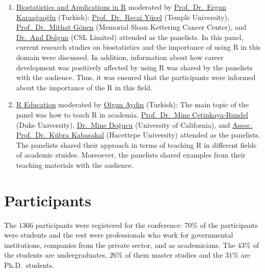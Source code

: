 \begin{enumerate}
\def\labelenumi{\arabic{enumi}.}
\item
  \href{https://www.youtube.com/watch?v=ZDMXOOVqwI8}{Biostatistics and Applications in R} moderated by \href{https://www.linkedin.com/in/ergun-karaagaoglu-8960404b/}{Prof.~Dr.~Ergun Karaağaoğlu} (Turkish):
  \href{https://cph.temple.edu/about/faculty-staff/recai-yucel-tuo13025}{Prof.~Dr.~Recai Yücel} (Temple University), \href{https://www.mskcc.org/profile/mithat-gonen}{Prof.~Dr.~Mithat Gönen} (Memorial Sloan Kettering Cancer Center), and \href{https://www.linkedin.com/in/anildolgun}{Dr.~Anıl Dolgun} (CSL Limited) attended as the panelists. In this panel, current research studies on biostatistics and the importance of using R in this domain were discussed. In addition, information about how career development was positively affected by using R was shared by the panelists with the audience. Thus, it was ensured that the participants were informed about the importance of the R in this field.
\item
  \href{https://www.youtube.com/watch?v=z2gTRUO-G58}{R Education} moderated by \href{https://www.linkedin.com/in/olgun-aydin/}{Olgun Aydin} (Turkish):
  The main topic of the panel was how to teach R in academia. \href{https://www.linkedin.com/in/minec/}{Prof.~Dr.~Mine Çetinkaya-Rundel} (Duke University), \href{https://www.linkedin.com/in/minedogucu/}{Dr.~Mine Doğucu} (University of California), and \href{https://www.linkedin.com/in/k\%C3\%BCbra-atalay-kabasakal-218a7131/}{Assoc. Prof.~Dr.~Kübra Kabasakal} (Hacettepe University) attended as the panelists. The panelists shared their approach in terms of teaching R in different fields of academic stuides. Moreoever, the panelists shared examples from their teaching materials with the audience.
\end{enumerate}

\hypertarget{participants}{%
\section{Participants}\label{participants}}

The \(1366\) participants were registered for the conference: \(70\%\) of the participants were students and the rest were professionals who work for governmental institutions, companies from the private sector, and as academicians. The \(43\%\) of the students are undergraduates, \(26\%\) of them master studies and the \(31\%\) are Ph.D.~students.

